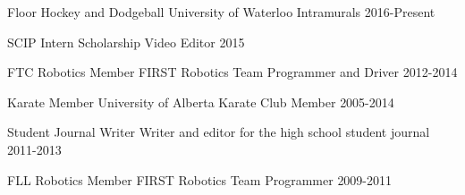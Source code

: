 


\begin{cvhonors}

\cvhonor
{Floor Hockey and Dodgeball} %
{University of Waterloo Intramurals} %
{} %
{2016-Present} %

\cvhonor
{SCIP Intern Scholarship} %
{Video Editor} %
{} %
{2015} %

\cvhonor
{FTC Robotics Member} %
{FIRST Robotics Team Programmer and Driver} %
{} %
{2012-2014} %

\cvhonor
{Karate Member} %
{University of Alberta Karate Club Member} %
{} %
{2005-2014} %


\cvhonor
{Student Journal Writer} %
{Writer and editor for the high school student journal} %
{} %
{2011-2013} %

\cvhonor
{FLL Robotics Member} %
{FIRST Robotics Team Programmer} %
{} %
{2009-2011} %


\end{cvhonors}
